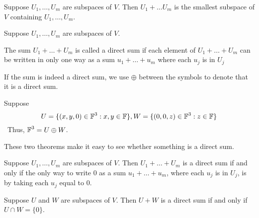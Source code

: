 \begin{theorem}
    Suppose $U_1, \ldots, U_m$ are subspaces of $V$. Then $U_1 + \ldots U_m$ is the smallest
    subspace of $V$ containing $U_1, \ldots, U_m$.
\end{theorem}

\begin{definition}
    Suppose $U_1, \ldots, U_m$ are subspaces of $V$.

    The sum $U_1 + \ldots + U_m$ is called a direct sum if each element of $U_1 + \ldots + U_m$
    can be written in only one way as a sum $u_1 + \ldots + u_m$ where each $u_j$ is in $U_j$

    If the sum is indeed a direct sum, we use $\oplus$ between the symbols to denote that it is a direct sum.
\end{definition}

\begin{example}
    Suppose
    \[ U = \{(x, y, 0)\in \operatorname{\mathbb{F}}^3 : x, y \in \operatorname{\mathbb{F}} \}, W = \{(0, 0, z) \in \operatorname{\mathbb{F}}^3 : z \in \operatorname{\mathbb{F}} \} \]\
    Thus, $\operatorname{\mathbb{F}}^3 = U \oplus W$.
\end{example}

These two theorems make it easy to see whether something is a direct sum.
\begin{theorem}
    Suppose $U_1, \ldots, U_m$ are subspaces of $V$. Then $U_1 + \ldots + U_m$ is a 
    direct sum if and only if the only way to write 0 as a sum $u_1 + \ldots + u_m$, where
    each $u_j$ is in $U_j$, is by taking each $u_j$ equal to 0.
\end{theorem}

\begin{theorem}
   Suppose $U$ and $W$ are subspaces of $V$. Then $U + W$ is a direct sum
   if and only if $U \cap W = \{0\}$.
\end{theorem}
\endinput